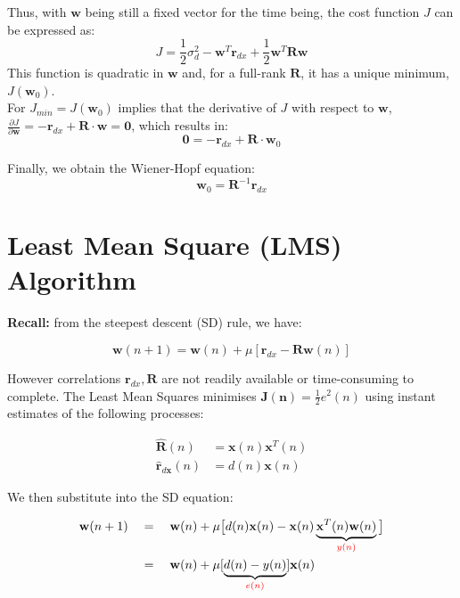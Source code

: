 Thus, with \( \mathbf{w} \) being still a fixed vector for the time being, the cost function \( J \) can be expressed as:
\begin{equation}
J = \frac{1}{2} \sigma_d^2 - \mathbf{w}^T \mathbf{r}_{dx} + \frac{1}{2} \mathbf{w}^T \mathbf{R} \mathbf{w}
\end{equation}
This function is quadratic in \( \mathbf{w} \) and, for a full-rank \( \mathbf{R} \), it has a unique minimum, \( J(\mathbf{w}_0) \).\\

For \( J_{min} = J(\mathbf{w}_0) \) implies that the derivative of \( J \) with respect to \( \mathbf{w} \), \( \frac{\partial J}{\partial \mathbf{w}} = -\mathbf{r}_{dx} + \mathbf{R} \cdot \mathbf{w} = \mathbf{0} \), which results in:
\begin{equation}
\mathbf{0} = -\mathbf{r}_{dx} + \mathbf{R} \cdot \mathbf{w}_0
\end{equation}

Finally, we obtain the Wiener-Hopf equation:
\begin{equation}
\mathbf{w}_0 = \mathbf{R}^{-1} \mathbf{r}_{dx}
\end{equation}



\section{Least Mean Square (LMS) Algorithm}
\textbf{Recall: } from the steepest descent (SD) rule, we have:

\begin{equation}
\mathbf{w}(n + 1) = \mathbf{w}(n) + \mu \left[ \mathbf{r}_{dx} - \mathbf{R}\mathbf{w}(n) \right]
\end{equation}

However correlations $ \mathbf{r}_{dx}, \mathbf{R}$ are not readily available or time-consuming to complete. The Least Mean Squares minimises $\mathbf{J(n)}=\frac12e^2(n)$ using instant estimates of the following processes:

\begin{align}
\mathbf{\hat{R}}(n)&=\mathbf{x}(n)\mathbf{x}^T(n)\\
\mathbf{\hat{r}}_{d\mathbf{x}}(n)&=d(n)\mathbf{x}(n)
\end{align}

We then substitute into the SD equation:

\begin{equation}
    \begin{aligned}\mathbf{w}(n+1)\quad&=\quad\mathbf{w}(n)+\mu\big[d(n)\mathbf{x}(n)-\mathbf{x}(n)\underbrace{\mathbf{x}^T(n)\mathbf{w}(n)}_{\color{red}{y}(n)}\big]\\&=\quad\mathbf{w}(n)+\mu[\underbrace{d(n)-y(n)}_{\color{red}{e}(n)}]\mathbf{x}(n)\end{aligned}
\end{equation}

